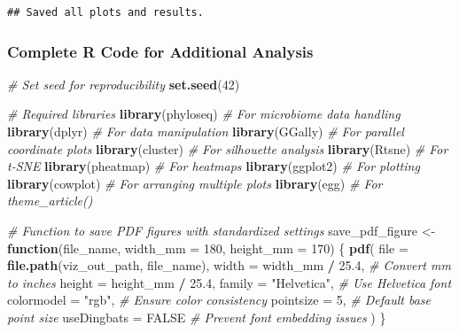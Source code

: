 \documentclass[
]{article}
\newenvironment{Shaded}{\begin{snugshade}}{\end{snugshade}}
\newcommand{\AttributeTok}[1]{\textcolor[rgb]{0.13,0.29,0.53}{#1}}
\newcommand{\CommentTok}[1]{\textcolor[rgb]{0.56,0.35,0.01}{\textit{#1}}}
\newcommand{\ConstantTok}[1]{\textcolor[rgb]{0.56,0.35,0.01}{#1}}
\newcommand{\ControlFlowTok}[1]{\textcolor[rgb]{0.13,0.29,0.53}{\textbf{#1}}}
\newcommand{\DecValTok}[1]{\textcolor[rgb]{0.00,0.00,0.81}{#1}}
\newcommand{\FloatTok}[1]{\textcolor[rgb]{0.00,0.00,0.81}{#1}}
\newcommand{\FunctionTok}[1]{\textcolor[rgb]{0.13,0.29,0.53}{\textbf{#1}}}
\newcommand{\NormalTok}[1]{#1}
\newcommand{\OtherTok}[1]{\textcolor[rgb]{0.56,0.35,0.01}{#1}}
\newcommand{\SpecialCharTok}[1]{\textcolor[rgb]{0.81,0.36,0.00}{\textbf{#1}}}
\newcommand{\StringTok}[1]{\textcolor[rgb]{0.31,0.60,0.02}{#1}}
\begin{document}
\begin{verbatim}
## Saved all plots and results.
\end{verbatim}

\subsubsection{Complete R Code for Additional
Analysis}\label{complete-r-code-for-additional-analysis}

\begin{Shaded}
\begin{Highlighting}[]
\CommentTok{\# Set seed for reproducibility}
\FunctionTok{set.seed}\NormalTok{(}\DecValTok{42}\NormalTok{)}

\CommentTok{\# Required libraries}
\FunctionTok{library}\NormalTok{(phyloseq) }\CommentTok{\# For microbiome data handling}
\FunctionTok{library}\NormalTok{(dplyr) }\CommentTok{\# For data manipulation}
\FunctionTok{library}\NormalTok{(GGally) }\CommentTok{\# For parallel coordinate plots}
\FunctionTok{library}\NormalTok{(cluster) }\CommentTok{\# For silhouette analysis}
\FunctionTok{library}\NormalTok{(Rtsne) }\CommentTok{\# For t{-}SNE}
\FunctionTok{library}\NormalTok{(pheatmap) }\CommentTok{\# For heatmaps}
\FunctionTok{library}\NormalTok{(ggplot2) }\CommentTok{\# For plotting}
\FunctionTok{library}\NormalTok{(cowplot) }\CommentTok{\# For arranging multiple plots}
\FunctionTok{library}\NormalTok{(egg) }\CommentTok{\# For theme\_article()}

\CommentTok{\# Function to save PDF figures with standardized settings}
\NormalTok{save\_pdf\_figure }\OtherTok{\textless{}{-}} \ControlFlowTok{function}\NormalTok{(file\_name, }\AttributeTok{width\_mm =} \DecValTok{180}\NormalTok{, }\AttributeTok{height\_mm =} \DecValTok{170}\NormalTok{) \{}
  \FunctionTok{pdf}\NormalTok{(}
    \AttributeTok{file =} \FunctionTok{file.path}\NormalTok{(viz\_out\_path, file\_name),}
    \AttributeTok{width =}\NormalTok{ width\_mm }\SpecialCharTok{/} \FloatTok{25.4}\NormalTok{,  }\CommentTok{\# Convert mm to inches}
    \AttributeTok{height =}\NormalTok{ height\_mm }\SpecialCharTok{/} \FloatTok{25.4}\NormalTok{,}
    \AttributeTok{family =} \StringTok{"Helvetica"}\NormalTok{,     }\CommentTok{\# Use Helvetica font}
    \AttributeTok{colormodel =} \StringTok{"rgb"}\NormalTok{,       }\CommentTok{\# Ensure color consistency}
    \AttributeTok{pointsize =} \DecValTok{5}\NormalTok{,            }\CommentTok{\# Default base point size}
    \AttributeTok{useDingbats =} \ConstantTok{FALSE}       \CommentTok{\# Prevent font embedding issues}
\NormalTok{  )}
\NormalTok{\}}


\end{Highlighting}
\end{Shaded}
\end{document}
